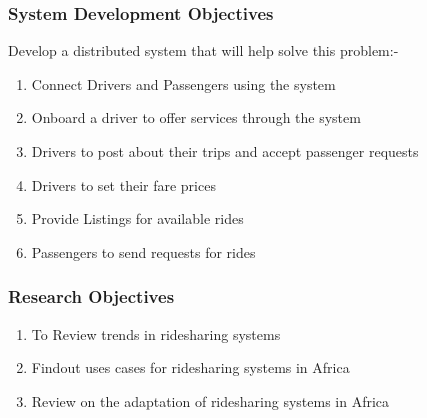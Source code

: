 
\subsubsection{System Development Objectives}
Develop a distributed system that will help solve this problem:-

\begin{enumerate}
    \item Connect Drivers and Passengers using the system
    \item Onboard a driver to offer services through the system
    \item Drivers to post about their trips and accept passenger requests
    \item Drivers to set their fare prices
    \item Provide Listings for available rides
    \item Passengers to send requests for rides
\end{enumerate}

\subsubsection{Research Objectives}
\begin{enumerate}
    \item To Review trends in ridesharing systems
    \item Findout uses cases for ridesharing systems in Africa
    \item Review on the adaptation of ridesharing systems in Africa
\end{enumerate}
